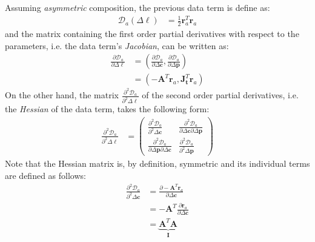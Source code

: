Assuming \emph{asymmetric} composition, the previous data term is define as:
\begin{equation}
    \begin{aligned}
		\mathcal{D}_a(\Delta \boldsymbol{\ell}) & = \frac{1}{2}\mathbf{r}_a^T \mathbf{r}_a
    \label{eq:asymmetric_data}
    \end{aligned}
\end{equation}
and the matrix containing the first order partial derivatives with respect to the parameters, i.e. the data term's \emph{Jacobian}, can be written as:
\begin{equation}
    \begin{aligned}
		\frac{\partial \mathcal{D}_a}{\partial \Delta \boldsymbol{\ell}} & = \left( \frac{\partial \mathcal{D}_a}{\partial \Delta \mathbf{c}}, \frac{\partial \mathcal{D}_a}{\partial \Delta \mathbf{p}} \right)
		\\
		& = \left( -\mathbf{A}^T \mathbf{r}_a, \mathbf{J}_{\mathbf{t}}^T \mathbf{r}_a \right)
    \label{eq:asymmetric_newton_jacobian}
    \end{aligned}
\end{equation}
On the other hand, the matrix $\frac{\partial^2 \mathcal{D}_a}{\partial^2 \Delta \boldsymbol{\ell}}$ of the second order partial derivatives, i.e. the \emph{Hessian} of the data term, takes the following form:
\begin{equation}
    \begin{aligned}
		\frac{\partial^2 \mathcal{D}_a}{\partial^2 \Delta \boldsymbol{\ell}} & =
		\begin{pmatrix}
			\frac{\partial^2 \mathcal{D}_a}{\partial^2 \Delta \mathbf{c}} & \frac{\partial^2 \mathcal{D}_a}{\partial \Delta \mathbf{c} \partial \Delta \mathbf{p}}
			\\
			\frac{\partial^2 \mathcal{D}_a}{\partial \Delta \mathbf{p} \partial \Delta \mathbf{c}} & \frac{\partial^2 \mathcal{D}_a}{\partial^2 \Delta \mathbf{p}}
		\end{pmatrix}
    \label{eq:asymmetric_newton_hessian}
    \end{aligned}
\end{equation}
Note that the Hessian matrix is, by definition, symmetric and its individual terms are defined as follows:
\begin{equation}
    \begin{aligned}
		\frac{\partial^2 \mathcal{D}_a}{\partial^2 \Delta \mathbf{c}} & = \frac{\partial -\mathbf{A}^T \mathbf{r}_a}{\partial \Delta \mathbf{c}}
		\\
		& = -\mathbf{A}^T \frac{\partial \mathbf{r}_a}{\partial \Delta \mathbf{c}}
		\\
		& = \underbrace{\mathbf{A}^T \mathbf{A}}_{\mathbf{I}}
    \label{eq:asymmetric_hessian_term1}
    \end{aligned}
\end{equation}
